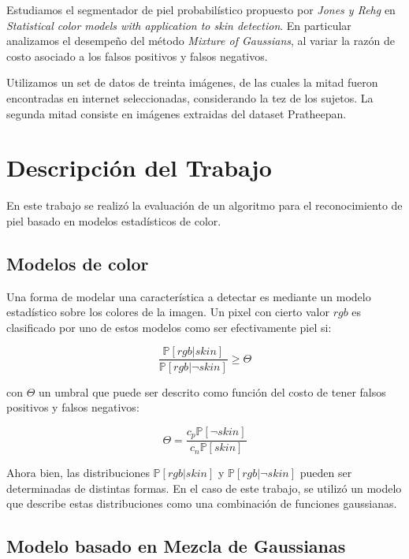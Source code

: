 \documentclass[12pt]{article}
\begin{document}
Estudiamos el segmentador de piel probabilístico propuesto por \emph{Jones y
Rehg} en \emph{Statistical color models with application to skin detection}. En
particular analizamos el desempeño del método \emph{Mixture of Gaussians}, al
variar la razón de costo asociado a los falsos positivos y falsos negativos.

Utilizamos un set de datos de treinta imágenes, de las cuales la mitad fueron
encontradas en internet seleccionadas, considerando la tez de los sujetos. La
segunda mitad consiste en imágenes extraidas del dataset Pratheepan.

\section{Descripción del Trabajo}

En este trabajo se realizó la evaluación de un algoritmo para el reconocimiento
de piel basado en modelos estadísticos de color. 

\subsection{Modelos de color}

Una forma de modelar una característica a detectar es mediante un modelo
estadístico sobre los colores de la imagen. Un pixel con cierto valor $rgb$ es
clasificado por uno de estos modelos como ser efectivamente piel si:

\begin{equation}
    \frac{ \mathbb{P} [ rgb|skin ] }{ \mathbb{P} [ rgb | \neg skin ] } \geq
    \Theta
\end{equation}

con $\Theta$ un umbral que puede ser descrito como función del costo de tener
falsos positivos y falsos negativos:

\begin{equation}
    \Theta = \frac{c_p \mathbb{P} [\neg skin]}{c_n \mathbb{P}[skin]}
\end{equation}

Ahora bien, las distribuciones $\mathbb{P} [ rgb|skin ]$ y $\mathbb{P} [ rgb | \neg
skin ]$ pueden ser determinadas de distintas formas. En el caso de este trabajo, se
utilizó un modelo que describe estas distribuciones como una combinación de
funciones gaussianas.

\subsection{Modelo basado en Mezcla de Gaussianas}
\end{document}
